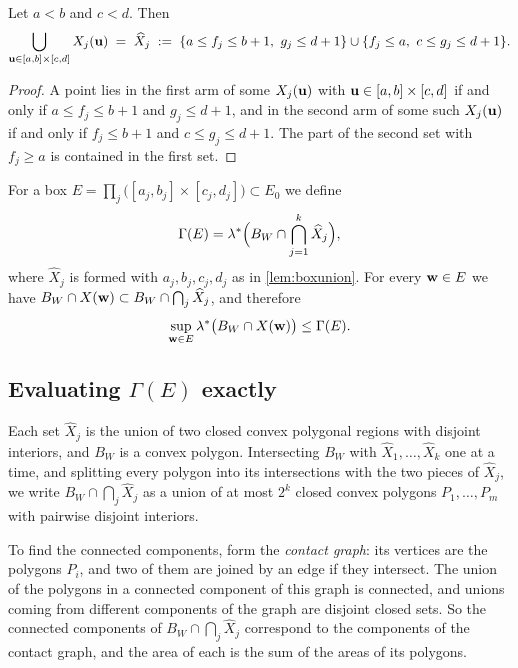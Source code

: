 \begin{lem}\label{lem:boxunion}
Let $a<b$ and $c<d$. Then
\[
\bigcup_{\mathbf{u}\in[a,b]\times[c,d]}X_j(\mathbf{u})\;=\;\widehat{X}_j\;:=\;\{a\le f_j\le b+1,\ g_j\le d+1\}\cup\{f_j\le a,\ c\le g_j\le d+1\}.
\]
\end{lem}

\begin{proof}
A point lies in the first arm of some $X_j(\mathbf{u})$ with $\mathbf{u}\in[a,b]\times[c,d]$ if and only if $a\le f_j\le b+1$ and $g_j\le d+1$, and in the second arm of some such $X_j(\mathbf{u})$ if and only if $f_j\le b+1$ and $c\le g_j\le d+1$. The part of the second set with $f_j\ge a$ is contained in the first set.
\end{proof}

For a box $E=\prod_{j}\big([a_j,b_j]\times[c_j,d_j]\big)\subset E_0$ we define
\[
\Gamma(E)=\lambda^{*}\Big(B_W\cap\bigcap_{j=1}^k\widehat{X}_j\Big),
\]
where $\widehat{X}_j$ is formed with $a_j,b_j,c_j,d_j$ as in \cref{lem:boxunion}. For every $\mathbf{w}\in E$ we have $B_W\cap X(\mathbf{w})\subset B_W\cap\bigcap_j\widehat{X}_j$, and therefore
\begin{equation}\label{eq:Gammabound}
\sup_{\mathbf{w}\in E}\lambda^{*}\big(B_W\cap X(\mathbf{w})\big)\le\Gamma(E).
\end{equation}

\subsection{Evaluating \texorpdfstring{$\Gamma(E)$}{Gamma(E)} exactly}\label{sec:exact}

Each set $\widehat{X}_j$ is the union of two closed convex polygonal regions with disjoint interiors, and $B_W$ is a convex polygon. Intersecting $B_W$ with $\widehat{X}_1,\dots,\widehat{X}_k$ one at a time, and splitting every polygon into its intersections with the two pieces of $\widehat{X}_j$, we write $B_W\cap\bigcap_j\widehat{X}_j$ as a union of at most $2^k$ closed convex polygons $P_1,\dots,P_m$ with pairwise disjoint interiors.

To find the connected components, form the \emph{contact graph}: its vertices are the polygons $P_i$, and two of them are joined by an edge if they intersect. The union of the polygons in a connected component of this graph is connected, and unions coming from different components of the graph are disjoint closed sets. So the connected components of $B_W\cap\bigcap_j\widehat{X}_j$ correspond to the components of the contact graph, and the area of each is the sum of the areas of its polygons.

